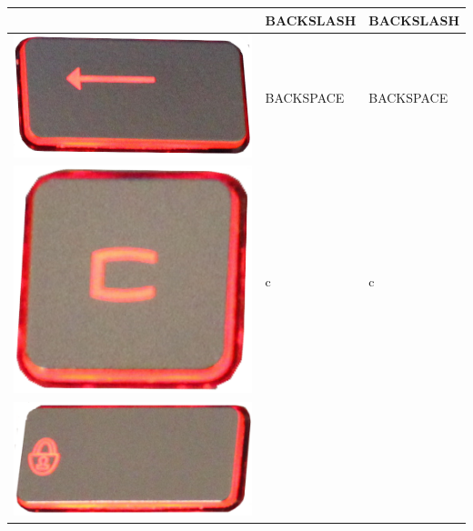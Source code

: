 \begin{longtable}{|cll|}
\begin{minipage}[c]{.4\textwidth}
\vspace{0.2cm}
\end{minipage} & BACKSLASH & BACKSLASH\\
\hline
\begin{minipage}[c]{.4\textwidth}
\vspace{0.2cm}
\includegraphics[scale=0.08]{Images/KeyMapping/BACKSPACE}
\vspace{0.2cm}
\end{minipage} & BACKSPACE & BACKSPACE\\
\hline
\begin{minipage}[c]{.4\textwidth}
\vspace{0.2cm}
\includegraphics[scale=0.08]{Images/KeyMapping/c}
\vspace{0.2cm}
\end{minipage} & c & c\\
\hline
\begin{minipage}[c]{.4\textwidth}
\vspace{0.2cm}
\includegraphics[scale=0.08]{Images/KeyMapping/CAPS_LOCK}

\end{minipage}
\end{longtable}
